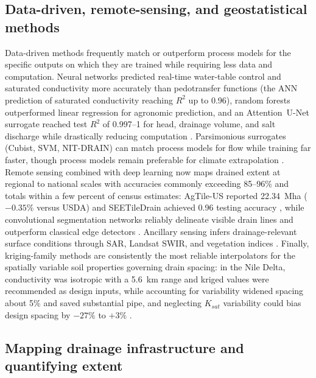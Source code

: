 \subsection{Data-driven, remote-sensing, and geostatistical methods}

Data-driven methods frequently match or outperform process models for the
specific outputs on which they are trained while requiring less data and
computation. Neural networks predicted real-time water-table control and
saturated conductivity more accurately than pedotransfer functions
(the ANN prediction of saturated conductivity reaching $R^2$ up to 0.96),
random forests outperformed linear regression
for agronomic prediction, and an Attention~U-Net surrogate reached test $R^2$
of 0.997--1 for head, drainage volume, and salt discharge while drastically
reducing computation
\parencite{Yang2000,Ellafi2021,Djiemon2019,Lei2026,Sarangi2006,Bakhsh2005b,Bakhsh2007b}.
Parsimonious surrogates (Cubist, SVM, NIT-DRAIN) can match process models for
flow while training far faster, though process models remain preferable for
climate extrapolation
\parencite{Sharma2003,Negm2016,Frederiksen2023,Chelil2022,Li2025}. Remote
sensing combined with deep learning now maps drained extent at regional to
national scales with accuracies commonly exceeding 85--96\% and totals within a
few percent of census estimates: AgTile-US reported 22.34~Mha ($-0.35\%$ versus
USDA) and SEETileDrain achieved 0.96 testing accuracy
\parencite{Valayamkunnath2020,Wan2024,Moller2018}, while convolutional
segmentation networks reliably delineate visible drain lines and outperform
classical edge detectors \parencite{Redoloza2023,Song2021,Woo2023,Naz2009}.
Ancillary sensing infers drainage-relevant surface conditions through SAR,
Landsat SWIR, and vegetation indices
\parencite{Meunier2001,Rijal2013,Xu2018,Khanal2020}. Finally, kriging-family
methods are consistently the most reliable interpolators for the spatially
variable soil properties governing drain spacing: in the Nile Delta,
conductivity was isotropic with a 5.6~km range and kriged values were
recommended as design inputs, while accounting for variability widened spacing
about 5\% and saved substantial pipe, and neglecting $K_{sat}$ variability
could bias design spacing by $-27\%$ to $+3\%$
\parencite{GALLICHAND1991,GALLICHAND1992,GALLICHAND1993,Moustafa1998b,Moustafa2000,Moustafa1998,Akis2015,Sepaskhah2004}.

\subsection{Mapping drainage infrastructure and quantifying extent}

